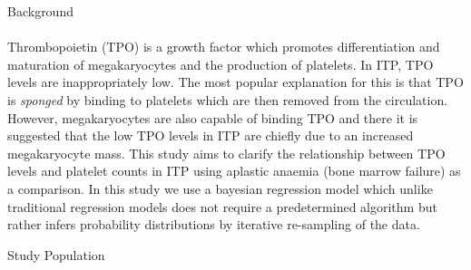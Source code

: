 \documentclass[landscape,a0paper,fontscale=0.285]{beamer} %
\newlength{\onecolwid}
\begin{document}
\begin{frame}[t]
\begin{columns}[t]
\begin{column}{\onecolwid}
\begin{alertblock}{Background}
\paragraph{} Thrombopoietin (TPO) is a growth factor which promotes differentiation and maturation of megakaryocytes and the production of platelets.
In ITP, TPO levels are inappropriately low. The most popular explanation for this is that TPO is \emph{sponged} by binding to platelets which are then removed from the circulation\cite{Kuterreciprocalrelationshipthrombopoietin1995}. However, megakaryocytes are also capable of binding TPO and there it is suggested that the low TPO levels in ITP are chiefly due to an increased megakaryocyte mass\cite{SatoBindingregulationthrombopoietin1998}. This study aims to clarify the relationship between TPO levels and platelet counts in ITP using aplastic anaemia (bone marrow failure) as a comparison. In this study we use a bayesian regression model which unlike traditional regression models does not require a predetermined algorithm but rather infers probability distributions by iterative re-sampling of the data\cite{ChaturvediRobustBayesiananalysis1996}. 








\end{alertblock}

\begin{block}{Study Population}


\end{block}
\end{column}
\end{columns}
\end{frame}
\end{document}
